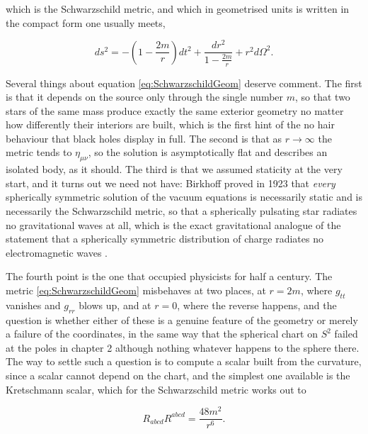         which is the Schwarzschild metric, and which in geometrised units is written in the compact form one usually meets,

        \begin{equation}\label{eq:SchwarzschildGeom}
            ds^2 = -\left(1-\frac{2m}{r}\right)dt^2 + \frac{dr^2}{1-\frac{2m}{r}} + r^2d\Omega^2.
        \end{equation}

        Several things about equation \ref{eq:SchwarzschildGeom} deserve comment. The first is that it depends on the source only through the single number $m$, so that two stars of the same mass produce exactly the same exterior geometry no matter how differently their interiors are built, which is the first hint of the no hair behaviour that black holes display in full. The second is that as $r\rightarrow\infty$ the metric tends to $\eta_{\mu\nu}$, so the solution is asymptotically flat and describes an isolated body, as it should. The third is that we assumed staticity at the very start, and it turns out we need not have: Birkhoff proved in 1923 that \textit{every} spherically symmetric solution of the vacuum equations is necessarily static and is necessarily the Schwarzschild metric, so that a spherically pulsating star radiates no gravitational waves at all, which is the exact gravitational analogue of the statement that a spherically symmetric distribution of charge radiates no electromagnetic waves \citep{wald1984}.

        The fourth point is the one that occupied physicists for half a century. The metric \ref{eq:SchwarzschildGeom} misbehaves at two places, at $r=2m$, where $g_{tt}$ vanishes and $g_{rr}$ blows up, and at $r=0$, where the reverse happens, and the question is whether either of these is a genuine feature of the geometry or merely a failure of the coordinates, in the same way that the spherical chart on $S^2$ failed at the poles in chapter 2 although nothing whatever happens to the sphere there. The way to settle such a question is to compute a scalar built from the curvature, since a scalar cannot depend on the chart, and the simplest one available is the Kretschmann scalar, which for the Schwarzschild metric works out to

        \begin{equation}\label{eq:Kretschmann}
            R_{abcd}R^{abcd} = \frac{48m^2}{r^6}.
        \end{equation}

